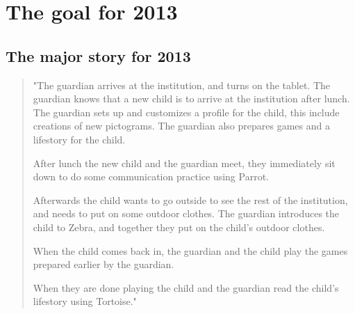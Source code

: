 
\section{The goal for 2013}

\subsection{The major story for 2013}
\begin{quote}
"The guardian arrives at the institution, and turns on the tablet.
The guardian knows that a new child is to arrive at the institution
after lunch. The guardian sets up and customizes a profile for the child,
this include creations of new pictograms.
The guardian also prepares games and a lifestory for the child.

After lunch the new child and the guardian meet, they immediately sit
down to do some communication practice using Parrot.

Afterwards the child wants to go outside to see the rest of the
institution, and needs to put on some outdoor clothes. The guardian
introduces the child to Zebra, and together they put on the child's
outdoor clothes.

When the child comes back in, the guardian and the child play the games
prepared earlier by the guardian.

When they are done playing the child and the guardian read the child's
lifestory using Tortoise."
\end{quote}
